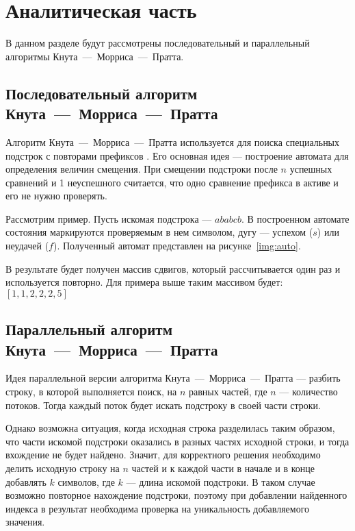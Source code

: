 \chapter{Аналитическая часть}
В данном разделе будут рассмотрены последовательный и параллельный алгоритмы Кнута~---~Морриса~---~Пратта. 

\section[Последовательный алгоритм Кнута~---~Морриса~---~Пратта]{Последовательный алгоритм \\Кнута~---~Морриса~---~Пратта}

Алгоритм Кнута~---~Морриса~---~Пратта используется для поиска специальных подстрок с повторами префиксов \cite{kmp}. Его основная идея --- построение автомата для определения величин смещения. При смещении подстроки после $n$ успешных сравнений и 1 неуспешного считается, что одно сравнение префикса в активе и его не нужно проверять.

Рассмотрим пример. Пусть искомая подстрока --- $ababcb$. В построенном автомате состояния маркируются проверяемым в нем символом, дугу --- успехом ($s$) или неудачей ($f$). Полученный автомат представлен на рисунке~\ref{img:auto}.


В результате будет получен массив сдвигов, который рассчитывается один раз и используется повторно. Для примера выше таким массивом будет:~$[1, 1, 2, 2, 2, 5]$

\section[Параллельный алгоритм Кнута~---~Морриса~---~Пратта]{Параллельный алгоритм \\Кнута~---~Морриса~---~Пратта}

Идея параллельной версии алгоритма Кнута~---~Морриса~---~Пратта --- разбить строку, в которой выполняется поиск, на $n$ равных  частей, где $n$ --- количество потоков. Тогда каждый поток будет искать подстроку в своей части строки.

Однако возможна ситуация, когда исходная строка разделилась таким образом, что части искомой подстроки оказались в разных частях исходной строки, и тогда вхождение не будет найдено. Значит, для корректного решения необходимо делить исходную строку на $n$ частей и к каждой части в начале и в конце добавлять $k$ символов, где $k$ --- длина искомой подстроки. В таком случае возможно повторное нахождение подстроки, поэтому при добавлении найденного индекса в результат необходима проверка на уникальность добавляемого значения.

